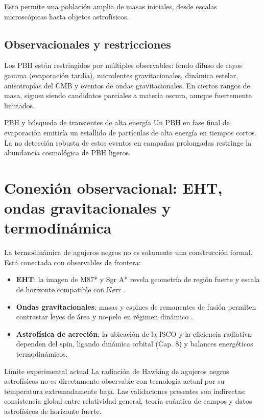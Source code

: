 Esto permite una población amplia de masas iniciales, desde escalas microscópicas hasta objetos astrofísicos.

\subsection{Observacionales y restricciones}

Los PBH están restringidos por múltiples observables: fondo difuso de rayos gamma (evaporación tardía), microlentes gravitacionales, dinámica estelar, anisotropías del CMB y eventos de ondas gravitacionales. En ciertos rangos de masa, siguen siendo candidatos parciales a materia oscura, aunque fuertemente limitados.

\begin{ejemplo}{PBH y búsqueda de transientes de alta energía}{}
Un PBH en fase final de evaporación emitiría un estallido de partículas de alta energía en tiempos cortos. La no detección robusta de estos eventos en campañas prolongadas restringe la abundancia cosmológica de PBH ligeros.
\end{ejemplo}

\section{Conexión observacional: EHT, ondas gravitacionales y termodinámica}
\label{sec:observacional_termo}

La termodinámica de agujeros negros no es solamente una construcción formal. Está conectada con observables de frontera:

\begin{itemize}[leftmargin=2em]
  \item \textbf{EHT}: la imagen de M87* y Sgr A* revela geometría de región fuerte y escala de horizonte compatible con Kerr \cite{EHT2019}.
  \item \textbf{Ondas gravitacionales}: masas y espines de remanentes de fusión permiten contrastar leyes de área y no-pelo en régimen dinámico \cite{Abbott2016prl}.
  \item \textbf{Astrofísica de acreción}: la ubicación de la ISCO y la eficiencia radiativa dependen del spin, ligando dinámica orbital (Cap. 8) y balances energéticos termodinámicos.
\end{itemize}

\begin{observacion}{Límite experimental actual}{}
La radiación de Hawking de agujeros negros astrofísicos no es directamente observable con tecnología actual por su temperatura extremadamente baja. Las validaciones presentes son indirectas: consistencia global entre relatividad general, teoría cuántica de campos y datos astrofísicos de horizonte fuerte.
\end{observacion}

